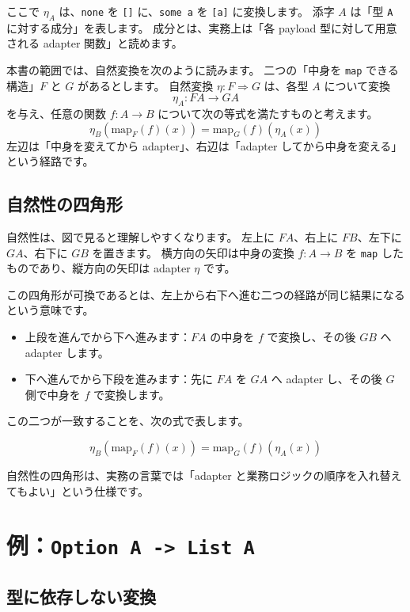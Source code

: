 ここで \(\eta_A\) は、\texttt{none} を \texttt{[]} に、\texttt{some a} を \texttt{[a]} に変換します。
添字 \(A\) は「型 \texttt{A} に対する成分」を表します。
成分とは、実務上は「各 payload 型に対して用意される adapter 関数」と読めます。

本書の範囲では、自然変換を次のように読みます。
二つの「中身を \texttt{map} できる構造」\(F\) と \(G\) があるとします。
自然変換 \(\eta : F \Rightarrow G\) は、各型 \(A\) について変換
\[
  \eta_A : F A \to G A
\]
を与え、任意の関数 \(f : A \to B\) について次の等式を満たすものと考えます。
\[
  \eta_B(\mathrm{map}_F(f)(x))
  =
  \mathrm{map}_G(f)(\eta_A(x))
\]
左辺は「中身を変えてから adapter」、右辺は「adapter してから中身を変える」という経路です。

\subsection{自然性の四角形}

自然性は、図で見ると理解しやすくなります。
左上に \(F A\)、右上に \(F B\)、左下に \(G A\)、右下に \(G B\) を置きます。
横方向の矢印は中身の変換 \(f : A \to B\) を \texttt{map} したものであり、縦方向の矢印は adapter \(\eta\) です。


この四角形が可換であるとは、左上から右下へ進む二つの経路が同じ結果になるという意味です。

\begin{itemize}
\item 上段を進んでから下へ進みます：\(F A\) の中身を \(f\) で変換し、その後 \(G B\) へ adapter します。
\item 下へ進んでから下段を進みます：先に \(F A\) を \(G A\) へ adapter し、その後 \(G\) 側で中身を \(f\) で変換します。
\end{itemize}

この二つが一致することを、次の式で表します。

\[
  \eta_B(\mathrm{map}_F(f)(x))
  =
  \mathrm{map}_G(f)(\eta_A(x))
\]

自然性の四角形は、実務の言葉では「adapter と業務ロジックの順序を入れ替えてもよい」という仕様です。

\section{例：\texttt{Option A -> List A}}

\subsection{型に依存しない変換}

